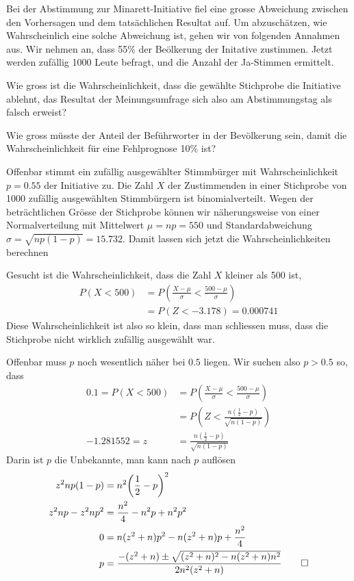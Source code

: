 Bei der Abstimmung zur Minarett-Initiative fiel eine grosse Abweichung zwischen
den Vorhersagen und dem tatsächlichen Resultat auf. Um abzuschätzen,
wie Wahrscheinlich eine solche Abweichung ist, gehen wir von folgenden
Annahmen aus. Wir nehmen an, dass 55\% der Beölkerung der Initative
zustimmen. Jetzt werden zufällig 1000 Leute befragt, und die Anzahl der
Ja-Stimmen ermittelt.
\begin{teilaufgaben}
\item
Wie gross ist die Wahrscheinlichkeit, dass die
gewählte Stichprobe die Initiative ablehnt, das Resultat der
Meinungsumfrage sich also am Abstimmungstag als falsch erweist?
\item Wie gross müsste der Anteil der Beführworter in der Bevölkerung
sein, damit die Wahrscheinlichkeit für eine Fehlprognose 10\% ist?
\end{teilaufgaben}


\begin{loesung}
Offenbar stimmt ein zufällig ausgewählter Stimmbürger mit
Wahrscheinlichkeit $p=0.55$ der Initiative zu. Die Zahl $X$ der Zustimmenden
in einer Stichprobe von 1000 zufällig ausgewählten Stimmbürgern ist
binomialverteilt. Wegen der beträchtlichen Grösse der Stichprobe können
wir näherungsweise von einer Normalverteilung mit Mittelwert $\mu=np=550$ und
Standardabweichung $\sigma=\sqrt{np(1-p)}
=15.732
$.
Damit lassen sich jetzt die Wahrscheinlichkeiten berechnen
\begin{teilaufgaben}
\item
Gesucht ist die Wahrscheinlichkeit, dass die Zahl $X$ kleiner als 500 ist,
\begin{align*}
P(X < 500)&=P\left(\frac{X-\mu}{\sigma}<\frac{500-\mu}{\sigma}\right)\\
        &=P(Z<
-3.178
)=0.000741
\end{align*}
Diese Wahrscheinlichkeit ist also so klein, dass man schliessen muss,
dass die Stichprobe nicht wirklich zufällig ausgewählt war.
\item
Offenbar muss $p$ noch wesentlich näher bei $0.5$ liegen.  Wir suchen also
$p>0.5$ so, dass
\begin{align*}
0.1=P(X<500)&=P\left(\frac{X-\mu}{\sigma}<\frac{500-\mu}{\sigma}\right)\\
&=P\left(Z<\frac{n(\frac12-p)}{\sqrt{n(1-p)}}\right)\\
-1.281552=
z&=\frac{n(\frac12-p)}{\sqrt{n(1-p)}}
\end{align*}
Darin ist $p$ die Unbekannte, man kann nach $p$ auflösen
\begin{align*}
z^2np(1-p)&=n^2\biggl(\frac12-p\biggr)^2\\
z^2np-z^2np^2
&=\frac{n^2}4-n^2p+n^2p^2
\\
0&=n(z^2+n)p^2
-n(z^2+n)p
+\frac{n^2}4
\\
p&=\frac{-(z^2+n)\pm\sqrt{(z^2+n)^2-n(z^2+n)n^2}}{2n^2(z^2+n)}
\qedhere
\end{align*}
\end{teilaufgaben}
\end{loesung}

